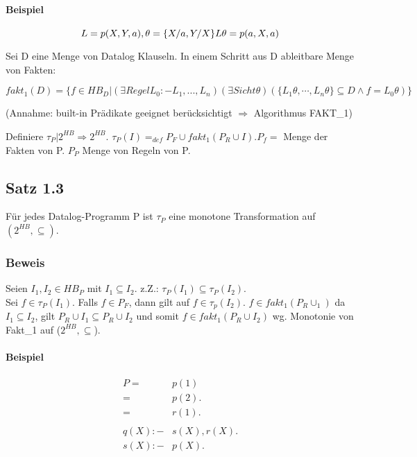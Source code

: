 \documentclass[12pt, a4paper]{article}
\begin{document}
\paragraph{Beispiel}

\begin{equation}
L = p(X, Y, a), \theta = \{X / a, Y / X \} \\
L\theta = p(a, X, a)
\end{equation}

Sei D eine Menge von Datalog Klauseln. In einem Schritt aus D ableitbare Menge von Fakten:

\begin{equation}
fakt_1(D) = \{ f \in HB_D | (\exists Regel L_0 :- L_1,...,L_n)(\exists Sicht \theta)(\{ L_1 \theta, \cdots, L_n\theta \} \subseteq D \wedge f = L_0\theta) \}
\end{equation}

(Annahme: built-in Prädikate geeignet berücksichtigt $\Rightarrow$ Algorithmus FAKT\_1)

Definiere $\tau_P | 2^{HB} \Rightarrow 2^{HB}$. $\tau_P(I) =_{def} P_F \cup fakt_1(P_R \cup I)$.$ P_f = $ Menge der Fakten von P. $P_P$ Menge von Regeln von P.

\subsection{Satz 1.3} Für jedes Datalog-Programm P ist $\tau_P$ eine monotone Transformation auf $(2^{HB}, \subseteq)$.

\subsubsection{Beweis}
Seien $I_1, I_2 \in HB_P$ mit $I_1 \subseteq I_2$. z.Z.: $\tau_P(I_1) \subseteq \tau_P(I_2)$. \\
Sei $f \in \tau_P(I_1)$. Falls $f \in P_F$, dann gilt auf $f \in \tau_p(I_2)$. $f \in fakt_1(P_R \cup _1)$ da $I_1 \subseteq I_2$, gilt $P_R \cup I_1 \subseteq P_R \cup I_2$ und somit $f \in fakt_1(P_R \cup I_2)$ wg. Monotonie von Fakt\_1 auf ($2^{HB}, \subseteq$).


\paragraph{Beispiel}

\begin{equation}
\begin{split}
P = &p(1) \\
= &p(2). \\
= &r(1). \\
&\\
q(X) :- &s(X), r(X). \\
s(X) :- &p(X).
\end{split}
\end{equation}
\end{document}
